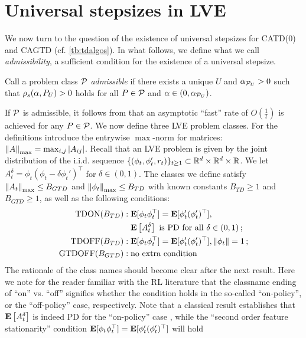 \section{Universal stepsizes in LVE}\label{sec:rl}
We now turn to the question of the existence of universal stepsizes for CATD(0) and CAGTD (cf. \cref{tb:tdalgos}). 
In what follows, we define what we call \emph{admissibility}, 
a sufficient condition for the existence of a universal stepsize. 
\begin{definition}\label{def:admis}
Call a problem class $\P$ \emph{admissible} if there exists a unique $U$ and $\alpha_{\P_U}>0$ such that
$\rhos{P_U}>0$ holds for all $P\in \P$ and $\alpha\in(0,\alpha_{\P_U})$.
\end{definition}
If $\P$ is admissible, it  follows from  that an asymptotic ``fast'' rate of $O(\frac1t)$ is achieved for any $P\in \cP$. 
We now define three LVE problem classes. For the definitions introduce
the entrywise $\max$-norm for matrices: $\norm{A}_{\max} = \max_{i,j} |A_{ij}|$.
Recall that an LVE problem is given by the joint distribution of the i.i.d. sequence
$\{(\phi_t,\phi_t',r_t)\}_{t\ge 1}\subset \R^d\times \R^d \times \R$. We let 
$A_t^\delta = \phi_t(\phi_t - \delta \phi_t')^\top$ for $\delta\in (0,1)$.
The classes we define satisfy $\norm{A_t}_{\max}\le B_{GTD}$ and $\norm{\phi_t}_{\max}\le B_{TD}$ with known constants $B_{TD}\ge 1$ and $B_{GTD}\ge 1$, 
as well as the following conditions:
\begin{align*}
\text{TDON}(B_{TD})&: \E[\phi_t\phi_t^\top]=\E[\phi'_t(\phi'_t)^\top], \\
						& \,\,\,\,\, \EE{A_t^\delta} \text{ is PD for all } \delta\in (0,1)\,;\\
\text{TDOFF}(B_{TD})&: \E[\phi_t\phi_t^\top]=\E[\phi'_t(\phi'_t)^\top], \norm{\phi_t}=1\,;\\
\text{GTDOFF}(B_{GTD})&: \text{no extra condition}
\end{align*}
The rationale of the class names should become clear after the next result.
Here we note for the reader familiar with the RL literature that the classname ending of ``on'' vs. ``off'' signifies
whether the condition holds in the so-called ``on-policy'', or the ``off-policy'' case, respectively.
Note that a classical result establishes that $\EE{A_t^\delta}$ is indeed PD for the ``on-policy'' case
\cite{su88},
while the ``second order feature stationarity'' condition $ \E[\phi_t\phi_t^\top]=\E[\phi'_t(\phi'_t)^\top]$ will hold 

